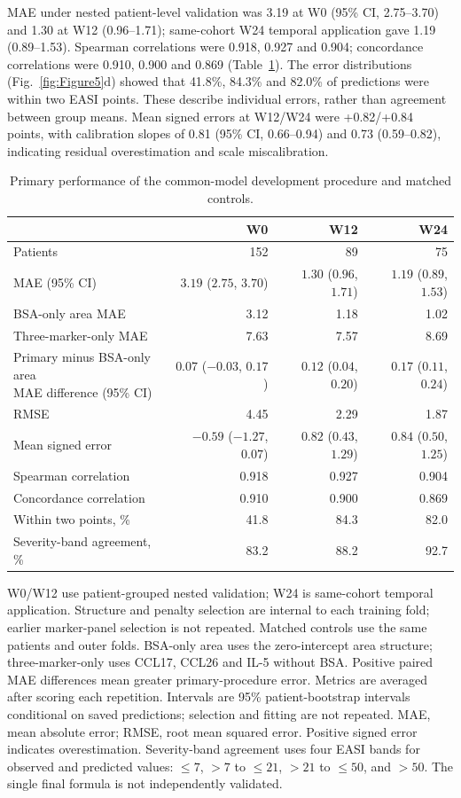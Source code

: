 \documentclass[10pt,a4paper]{article}
\begin{document}
MAE under nested patient-level validation was 3.19 at W0 (95\% CI, 2.75--3.70) and 1.30 at W12 (0.96--1.71); same-cohort W24 temporal application gave 1.19 (0.89--1.53). Spearman correlations were 0.918, 0.927 and 0.904; concordance correlations were 0.910, 0.900 and 0.869 (Table~\ref{tab:model}). The error distributions (Fig.~\ref{fig:Figure5}d) showed that 41.8\%, 84.3\% and 82.0\% of predictions were within two EASI points. These describe individual errors, rather than agreement between group means. Mean signed errors at W12/W24 were +0.82/+0.84 points, with calibration slopes of 0.81 (95\% CI, 0.66--0.94) and 0.73 (0.59--0.82), indicating residual overestimation and scale miscalibration.

\begin{table}[!htbp]
\centering\small
\caption{Primary performance of the common-model development procedure and matched controls.}\label{tab:model}
\begin{tabular}{lrrr}\toprule
 & W0 & W12 & W24 \\ \midrule
Patients & 152 & 89 & 75 \\
MAE (95\% CI) & $3.19$ ($2.75$, $3.70$) & $1.30$ ($0.96$, $1.71$) & $1.19$ ($0.89$, $1.53$) \\
BSA-only area MAE & 3.12 & 1.18 & 1.02 \\
Three-marker-only MAE & 7.63 & 7.57 & 8.69 \\
\shortstack[l]{Primary minus BSA-only area\\MAE difference (95\% CI)} & $0.07$ ($-0.03$, $0.17$) & $0.12$ ($0.04$, $0.20$) & $0.17$ ($0.11$, $0.24$) \\
RMSE & 4.45 & 2.29 & 1.87 \\
Mean signed error & $-0.59$ ($-1.27$, $0.07$) & $0.82$ ($0.43$, $1.29$) & $0.84$ ($0.50$, $1.25$) \\
Spearman correlation & 0.918 & 0.927 & 0.904 \\
Concordance correlation & 0.910 & 0.900 & 0.869 \\
Within two points, \% & 41.8 & 84.3 & 82.0 \\
Severity-band agreement, \% & 83.2 & 88.2 & 92.7 \\
\bottomrule\end{tabular}
\par\small\raggedright W0/W12 use patient-grouped nested validation; W24 is same-cohort temporal application. Structure and penalty selection are internal to each training fold; earlier marker-panel selection is not repeated. Matched controls use the same patients and outer folds. BSA-only area uses the zero-intercept area structure; three-marker-only uses CCL17, CCL26 and IL-5 without BSA. Positive paired MAE differences mean greater primary-procedure error. Metrics are averaged after scoring each repetition. Intervals are 95\% patient-bootstrap intervals conditional on saved predictions; selection and fitting are not repeated. MAE, mean absolute error; RMSE, root mean squared error. Positive signed error indicates overestimation. Severity-band agreement uses four EASI bands for observed and predicted values: $\leq7$, $>7$ to $\leq21$, $>21$ to $\leq50$, and $>50$. The single final formula is not independently validated.\end{table}
\end{document}
